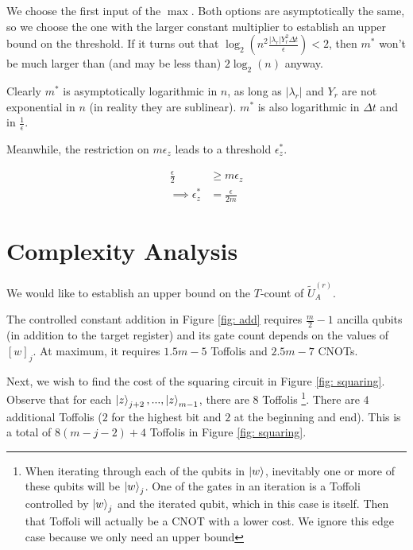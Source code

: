 We choose the first input of the $\max$. Both options are asymptotically the same, so we choose the one with the larger constant multiplier to establish an upper bound on the threshold. If it turns out that $\log_2\left(n^2\frac{|\lambda_r|Y_r^2\Delta t}{\epsilon}\right) < 2$, then $m^*$ won't be much larger than (and may be less than) $2\log_2(n)$ anyway.

Clearly $m^*$ is asymptotically logarithmic in $n$, as long as $|\lambda_r|$ and $Y_r$ are not exponential in $n$ (in reality they are sublinear). $m^*$ is also logarithmic in $\Delta t$ and in $\frac{1}{\epsilon}$.

Meanwhile, the restriction on $m\epsilon_z$ leads to a threshold $\epsilon_z^*$.

\begin{equation}
    \begin{split}
        \frac{\epsilon}{2} &\geq m\epsilon_z \\
        \implies \epsilon_z^* &= \frac{\epsilon}{2m} \label{eq: e_z}
    \end{split}
\end{equation}

\section{Complexity Analysis}

We would like to establish an upper bound on the $T$-count of $\tilde{U}_A^{(r)}$.

The controlled constant addition in Figure \ref{fig: add} requires $\frac{m}{2} - 1$ ancilla qubits (in addition to the target register) and its gate count depends on the values of $[w]_j$. At maximum, it requires $1.5m - 5$ Toffolis and $2.5m - 7$ CNOTs.

Next, we wish to find the cost of the squaring circuit in Figure \ref{fig: squaring}. Observe that for each $\ket{z}_{j + 2}, ..., \ket{z}_{m - 1}$, there are $8$ Toffolis \footnote{When iterating through each of the qubits in $\ket{w}$, inevitably one or more of these qubits will be $\ket{w}_j$. One of the gates in an iteration is a Toffoli controlled by $\ket{w}_j$ and the iterated qubit, which in this case is itself. Then that Toffoli will actually be a CNOT with a lower cost. We ignore this edge case because we only need an upper bound}. There are $4$ additional Toffolis ($2$ for the highest bit and $2$ at the beginning and end). This is a total of $8(m - j - 2) + 4$ Toffolis in Figure \ref{fig: squaring}.


